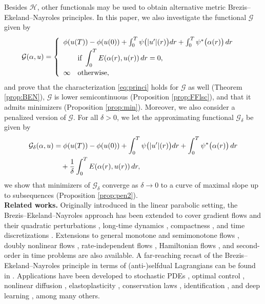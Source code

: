 \documentclass[10pt,a4paper]{amsart}
\newcommand{\disp}{\displaystyle}
\newcommand{\dr}{{\rm d} r}
\newcommand{\GG}{{\mathcal G}}
\newcommand{\HH}{{\mathcal H}}
\begin{document}
Besides $\HH$, other functionals may be used to obtain alternative metric
Brezis--Ekeland--Nayroles principles. In this paper, we also
investigate  the
functional  $\GG$ given by 
\begin{align*}
     \GG(\alpha,u) &=
     \left\{
     \begin{array}{l}
      \phi(u(T))-\phi(u(0)) + \int_0^T 
       \psi\big(|u'|(r)\big) \dr +  \int_0^T  \psi^*\big(\alpha
       (r)\big)\, \dr\\[1mm]
       \qquad \text{if} \ \disp \int_0^T E
                            (\alpha(r),u(r))\, \dr=0,\\[3mm]
       \infty\quad \text{otherwise},
     \end{array}
  \right.
\end{align*}
and prove that the characterization \eqref{eq:princi} holds for $\GG$
 as  well (Theorem \ref{prop:BEN}), $\GG$ is lower semicontinuous (Proposition \ref{prop:FFlsc}), and that it
  admits minimizers (Proposition \ref{prop:min}). Moreover, we also
  consider a penalized version of $\GG$. For all $\delta >0$, we let
  the approximating functional $\GG_\delta$ be given by 
  \begin{align*}
    \GG_\delta(\alpha,u) &=\phi(u(T))-\phi(u(0)) + \int_0^T 
       \psi\big(|u'|(r)\big) \dr +  \int_0^T  \psi^*\big(\alpha
       (r)\big)\, \dr \\
                                             &\quad +\frac{1}{\delta}\int_0^T E
                            (\alpha(r),u(r))\, \dr,
                                \end{align*}
                                 we
                                show that minimizers of $\GG_\delta$ converge as $\delta \to 0$ to
a curve of maximal slope up to subsequences (Proposition \ref{prop:pen2}).\\ 
 
\textbf{Related works.} Originally introduced in the linear parabolic
setting, the Brezis--Ekeland--Nayroles approach has been extended to cover gradient flows
\cite{Ghoussoub-Tzou04} and their quadratic perturbations
\cite{Ghoussoub-McCann04}, long-time dynamics \cite{Lemaire96},
compactness \cite{Visintin22}, and
time discretizations \cite{be2}. Extensions to general
monotone and semimonotone flows  \cite{Visintin13,Visintin16},
doubly nonlinear flows  \cite{be,Visintin11, Visintin21}, rate-independent flows
\cite{Visintin13b}, Hamiltonian flows \cite{Buliga, Ghoussoub, Ghoussoub2,
  Ghoussoub3},  and second-order in time problems  \cite{Mabrouk01,Mabrouk03}  are
also available. A far-reaching recast of the
Brezis--Ekeland--Nayroles principle in terms  of   (anti-)selfdual
Lagrangians can be found in \cite{Ghoussoub08}. Applications have been developed to stochastic PDEs
\cite{Barbu,Boroushaki}, optimal control \cite{Barbu12,portinale}, nonlinear
diffusion \cite{Marinoschi,Poliakovsky}, elastoplasticity
\cite{Cao,plas}, conservation laws \cite{Poliakovsky2}, identification
\cite{Barbu-Kunisch95}, and deep learning
\cite{Carini}, among many others.
\end{document}
